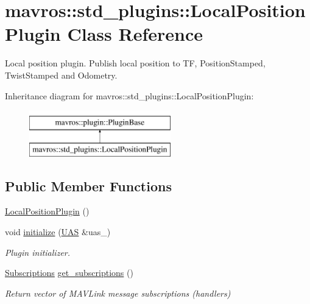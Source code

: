 \hypertarget{classmavros_1_1std__plugins_1_1LocalPositionPlugin}{}\section{mavros\+::std\+\_\+plugins\+::Local\+Position\+Plugin Class Reference}
\label{classmavros_1_1std__plugins_1_1LocalPositionPlugin}


Local position plugin. Publish local position to TF, Position\+Stamped, Twist\+Stamped and Odometry.  


Inheritance diagram for mavros\+::std\+\_\+plugins\+::Local\+Position\+Plugin\+:\begin{figure}[H]
\begin{center}
\leavevmode
\includegraphics[height=2.000000cm]{classmavros_1_1std__plugins_1_1LocalPositionPlugin}
\end{center}
\end{figure}
\subsection*{Public Member Functions}
\begin{DoxyCompactItemize}
\item 
\mbox{\hyperlink{group__plugin_gad2a26e43b5b4e92c9a25e65b42e7fcf9}{Local\+Position\+Plugin}} ()
\item 
void \mbox{\hyperlink{group__plugin_gaade9f826008c705ea3cd120c7154e26c}{initialize}} (\mbox{\hyperlink{classmavros_1_1UAS}{U\+AS}} \&uas\+\_\+)
\begin{DoxyCompactList}\small\item\em Plugin initializer. \end{DoxyCompactList}\item 
\mbox{\hyperlink{group__plugin_ga8967d61fc77040e0c3ea5a4585d62a09}{Subscriptions}} \mbox{\hyperlink{group__plugin_ga45d714bacb570023793b00c91a7695af}{get\+\_\+subscriptions}} ()
\begin{DoxyCompactList}\small\item\em Return vector of M\+A\+V\+Link message subscriptions (handlers) \end{DoxyCompactList}\end{DoxyCompactItemize}
